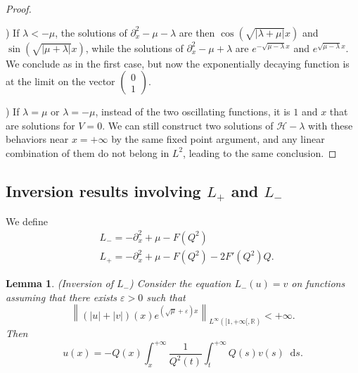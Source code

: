 \documentclass[11 pt]{amsart}
\newtheorem{lem}{Lemma}[section]
\theoremstyle{definition}
\theoremstyle{remark}
\numberwithin{equation}{section}
\newcommand{\dd}{\mathop{}\!\mathrm{d}}
\begin{document}
\begin{proof}
  \
  
)  If $\lambda < - \mu$, the solutions of $\partial_x^2 - \mu - \lambda$ are then
  $\cos \left( \sqrt{| \lambda + \mu |} x \right)$ and $\sin
  \left( \sqrt{| \mu + \lambda |} x \right)$, while the solutions of $\partial_x^2 -
  \mu + \lambda$ are $e^{-\sqrt{\mu -  \lambda } x}$
  and $e^{\sqrt{\mu -  \lambda } x}$. We conclude
  as in the first case, but now the exponentially decaying function is at the limit on the
  vector $\left(\begin{array}{c}
    0\\
    1
  \end{array}\right)$.

) If $\lambda = \mu$ or $\lambda = - \mu$, instead of the two oscillating functions, it is $1$ and $x$ that are solutions for $V=0$. We can still construct two solutions of $\mathcal{H}-\lambda$ with these behaviors near $x = +\infty$ by the same fixed point argument, and any linear combination of them do not belong in $L^2$, leading to the same conclusion.
  
\end{proof}

\subsection{Inversion results involving $L_+$ and $L_-$}

We define
\begin{align*}
& L_- = - \partial_x^2 + \mu - F (Q^2) \\
& L_+ = - \partial_x^2 + \mu - F (Q^2) - 2 F' (Q^2) Q.
\end{align*}
\begin{lem}(Inversion of $L_-$)
  \label{bonesintosand}
 Consider the equation $L_- (u) = v$ on functions assuming that there exists $\varepsilon > 0$ such that
  \[ \left\| (| u | + | v |) (x) e^{\left( \sqrt{\mu} + \varepsilon \right) x}
     \right\|_{L^{\infty} ([1, + \infty [, \mathbb{R})} < + \infty . \]
  Then
  \[ u (x) = - Q (x) \int_x^{+ \infty} \frac{1}{Q^2 (t) } \int_t^{+
     \infty} Q (s)  v (s) \dd s. \]
\end{lem}
\end{document}
